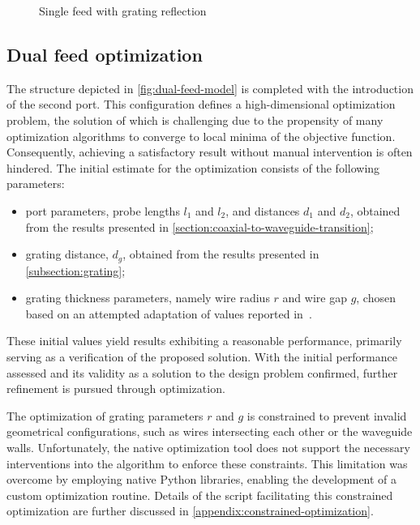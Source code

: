 \documentclass[11pt,a4paper,twoside,openany]{report}
\begin{document}
\begin{figure}[!ht]
    \centering
    
    \caption{\label{fig:single-feed-with-grating-reflection}Single feed with grating reflection}
\end{figure}

\subsection{Dual feed optimization}
\label{subsection:dual-feed-optimization}
The structure depicted in \cref{fig:dual-feed-model} is completed with the introduction of the second port. This configuration defines a high-dimensional optimization problem, the solution of which is challenging due to the propensity of many optimization algorithms to converge to local minima of the objective function. Consequently, achieving a satisfactory result without manual intervention is often hindered. The initial estimate for the optimization consists of the following parameters:
\begin{itemize}
    \item port parameters, probe lengths $l_1$ and $l_2$, and distances $d_1$ and $d_2$, obtained from the results presented in \cref{section:coaxial-to-waveguide-transition};
    \item grating distance, $d_g$, obtained from the results presented in \cref{subsection:grating};
    \item grating thickness parameters, namely wire radius $r$ and wire gap $g$, chosen based on an attempted adaptation of values reported in~\parencite{karki-et-al:dual-polarized-probe-for-planar-near-field-measurement}.
\end{itemize}
These initial values yield results exhibiting a reasonable performance, primarily serving as a verification of the proposed solution. With the initial performance assessed and its validity as a solution to the design problem confirmed, further refinement is pursued through optimization.

The optimization of grating parameters $r$ and $g$ is constrained to prevent invalid geometrical configurations, such as wires intersecting each other or the waveguide walls. Unfortunately, the native optimization tool does not support the necessary interventions into the algorithm to enforce these constraints.  This limitation was overcome by employing native Python libraries, enabling the development of a custom optimization routine. Details of the script facilitating this constrained optimization are further discussed in \cref{appendix:constrained-optimization}.
\end{document}
